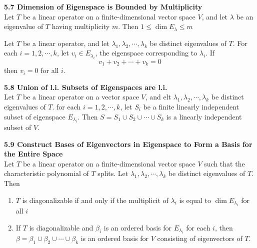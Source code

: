 \documentclass[11pt]{article}
\begin{document}
\begin{theorem*}
    \textbf{5.7 Dimension of Eigenspace is Bounded by Multiplicity} \\
    Let $T$ be a linear operator on a finite-dimensional vector space $V$, and let $\lambda$ be an eigenvalue of $T$ having multiplicity $m$. Then $1\leq \dim{E_{\lambda}} \leq m$
\end{theorem*}

\begin{lemma*}
    Let $T$ be a linear operator, and let $\lambda_1, \lambda_2, \cdots, \lambda_k$ be distinct eigenvalues of $T$. For each $i=1,2,\cdots, k$, let $v_i \in E_{\lambda_i}$, the eigenspace corresponding to $\lambda_i$. If 
    \[
        v_1 + v_2 + \cdots + v_k = 0    
    \]
    then $v_i = 0$ for all $i$. 
\end{lemma*}

\begin{theorem*}
    \textbf{5.8 Union of l.i. Subsets of Eigenspaces are l.i.} \\
    Let $T$ be a linear operator on a vector space $V$, and elt $\lambda_1,\lambda_2,\cdots, \lambda_k$ be distinct eigenvalues of $T$. for each $i=1,2,\cdots, k$, let $S_i$ be a finite linearly independent subset of eigenspace $E_{\lambda_i}$. Then $S=S_1 \cup S_2 \cup \cdots \cup S_k$ is a linearly independent subset of $V$.
\end{theorem*}


\begin{theorem*}
    \textbf{5.9 Construct Bases of Eigenvectors in Eigenspace to Form a Basis for the Entire Space}  \\
    Let $T$ be a linear operator on a finite-dimensional vector space $V$ such that the characteristic polynomial of $T$ splits. Let $\lambda_1,\lambda_2,\cdots, \lambda_k$ be distinct eigenvalues of $T$. Then 
    \begin{enumerate}
        \item $T$ is diagonalizable if and only if the multiplicit of $\lambda_i$ is equal to $\dim{E_{\lambda_i}}$ for all $i$
        \item If $T$ is diagonalizable and $\beta_i$ is an ordered basis for $E_{\lambda_i}$ for each $i$, then $\beta = \beta_1 \cup \beta_2 \cup \cdots \cup \beta_k$ is an ordered basis for $V$ consisting of eigenvectors of $T$. 
    \end{enumerate}
\end{theorem*}
\end{document}
